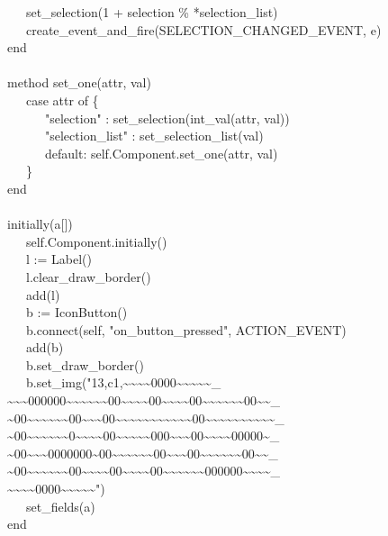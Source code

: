 {\>   \ \ \ set\_selection(1 + selection \% *selection\_list) \\
\>   \ \ \ create\_event\_and\_fire(SELECTION\_CHANGED\_EVENT, e) \\
\>   end \\
\ \\
\>   method set\_one(attr, val) \\
\>   \ \ \ case attr of \{ \\
\>   \ \ \ \ \ \ "selection" :
set\_selection(int\_val(attr, val)) \\
\>   \ \ \ \ \ \ "selection\_list" :
set\_selection\_list(val) \\
\>   \ \ \ \ \ \ default: self.Component.set\_one(attr, val) \\
\>   \ \ \ \} \\
\>   end \\
\ \\
\>   initially(a[])  \\
\>   \ \ \ self.Component.initially() \\
\>   \ \ \ l := Label() \\
\>   \ \ \ l.clear\_draw\_border() \\
\>   \ \ \ add(l) \\
\>   \ \ \ b := IconButton() \\
\>   \ \ \ b.connect(self,
"on\_button\_pressed", ACTION\_EVENT) \\
\>   \ \ \ add(b) \\
\>   \ \ \ b.set\_draw\_border() \\
\>   \ \ \ b.set\_img("13,c1,\~{}\~{}\~{}\~{}0000\~{}\~{}\~{}\~{}\~{}\_ \\
\>\>\~{}\~{}\~{}000000\~{}\~{}\~{}\~{}\~{}\~{}00\~{}\~{}\~{}\~{}00\~{}\~{}\~{}\~{}00\~{}\~{}\~{}\~{}\~{}\~{}00\~{}\~{}\_ \\
\>\>\~{}00\~{}\~{}\~{}\~{}\~{}\~{}00\~{}\~{}\~{}00\~{}\~{}\~{}\~{}\~{}\~{}\~{}\~{}\~{}\~{}\~{}00\~{}\~{}\~{}\~{}\~{}\~{}\~{}\~{}\~{}\~{}\_ \\
\>\>\~{}00\~{}\~{}\~{}\~{}\~{}\~{}0\~{}\~{}\~{}\~{}00\~{}\~{}\~{}\~{}\~{}000\~{}\~{}\~{}00\~{}\~{}\~{}\~{}00000\~{}\_ \\
\>\>\~{}00\~{}\~{}\~{}0000000\~{}00\~{}\~{}\~{}\~{}\~{}\~{}00\~{}\~{}\~{}00\~{}\~{}\~{}\~{}\~{}\~{}00\~{}\~{}\_ \\
\>\>\~{}00\~{}\~{}\~{}\~{}\~{}\~{}00\~{}\~{}\~{}\~{}00\~{}\~{}\~{}\~{}00\~{}\~{}\~{}\~{}\~{}\~{}000000\~{}\~{}\~{}\~{}\_ \\
\>\>\~{}\~{}\~{}\~{}0000\~{}\~{}\~{}\~{}\~{}") \\
\>   \ \ \ set\_fields(a) \\
end
}

